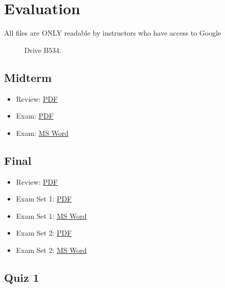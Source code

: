 \FILENAME

\section{Evaluation}\label{evaluation}

\begin{description}
\item[All files are ONLY readable by instructors who have access to
Google]
Drive B534.
\end{description}

\subsection{Midterm}\label{midterm}

\begin{itemize}

\item
  Review:
  \href{https://drive.google.com/open?id=0B88HKpainTSfWGM1T1g1Tk1mYmM}{PDF}
\item
  Exam:
  \href{https://drive.google.com/open?id=0B88HKpainTSfS0syc1NEVDJjZDA}{PDF}
\item
  Exam:
  \href{https://drive.google.com/open?id=0B88HKpainTSfbXhROGptVi1iN1k}{MS
  Word}
\end{itemize}

\subsection{Final}\label{final}

\begin{itemize}

\item
  Review:
  \href{https://drive.google.com/open?id=0B88HKpainTSfRnV2WXZWbTNtLWc}{PDF}
\item
  Exam Set 1:
  \href{https://drive.google.com/open?id=0B88HKpainTSfWnVjVHpJTUFFYlU}{PDF}
\item
  Exam Set 1:
  \href{https://drive.google.com/open?id=0B88HKpainTSfNU1ldmItN3RIcUU}{MS
  Word}
\item
  Exam Set 2:
  \href{https://drive.google.com/open?id=0B88HKpainTSfTVZxMTZ4MC1sNFU}{PDF}
\item
  Exam Set 2:
  \href{https://drive.google.com/open?id=0B88HKpainTSfMGRzWDgtT1VDbEk}{MS
  Word}
\end{itemize}

\subsection{Quiz 1}\label{quiz-1}

